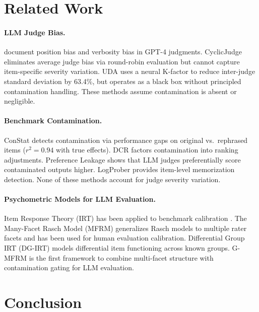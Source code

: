 \documentclass[11pt,a4paper]{article}
\begin{document}
\section{Related Work}

\paragraph{LLM Judge Bias.}
\citet{zheng2023judging} document position bias and verbosity bias in GPT-4 judgments. CyclicJudge \citep{lin2025cyclicjudge} eliminates average judge bias via round-robin evaluation but cannot capture item-specific severity variation. UDA \citep{li2024uda} uses a neural K-factor to reduce inter-judge standard deviation by 63.4\%, but operates as a black box without principled contamination handling. These methods assume contamination is absent or negligible.

\paragraph{Benchmark Contamination.}
ConStat \citep{dekoninck2024constat} detects contamination via performance gaps on original vs.\ rephrased items ($r^2 = 0.94$ with true effects). DCR \citep{yang2024dcr} factors contamination into ranking adjustments. Preference Leakage \citep{li2024preference} shows that LLM judges preferentially score contaminated outputs higher. LogProber provides item-level memorization detection. None of these methods account for judge severity variation.

\paragraph{Psychometric Models for LLM Evaluation.}
Item Response Theory (IRT) has been applied to benchmark calibration \citep{polo2024tinybenchmarks}. The Many-Facet Rasch Model (MFRM) \citep{linacre1989mfrm} generalizes Rasch models to multiple rater facets and has been used for human evaluation calibration. Differential Group IRT (DG-IRT) \citep{robitzsch2020dgirt} models differential item functioning across known groups. G-MFRM is the first framework to combine multi-facet structure with contamination gating for LLM evaluation.

\section{Conclusion}
\end{document}
